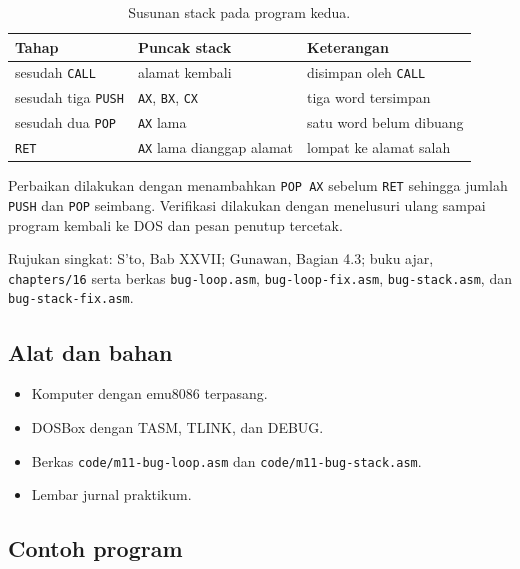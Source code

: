 \begin{table}[H]
    \centering
    \caption{Susunan stack pada program kedua.}
    \label{tab:m11-stack}
    \small
    \begin{tabular}{@{}lll@{}}
        \toprule
        \textbf{Tahap} & \textbf{Puncak stack} & \textbf{Keterangan} \\
        \midrule
        sesudah \texttt{CALL} & alamat kembali &
        disimpan oleh \texttt{CALL} \\
        sesudah tiga \texttt{PUSH} & \texttt{AX}, \texttt{BX},
        \texttt{CX} & tiga word tersimpan \\
        sesudah dua \texttt{POP} & \texttt{AX} lama &
        satu word belum dibuang \\
        \texttt{RET} & \texttt{AX} lama dianggap alamat &
        lompat ke alamat salah \\
        \bottomrule
    \end{tabular}
\end{table}

Perbaikan dilakukan dengan menambahkan \texttt{POP AX} sebelum
\texttt{RET} sehingga jumlah \texttt{PUSH} dan \texttt{POP}
seimbang. Verifikasi dilakukan dengan menelusuri ulang sampai program
kembali ke DOS dan pesan penutup tercetak.

\begin{rujukan}
Rujukan singkat: S'to, Bab XXVII; Gunawan, Bagian 4.3; buku ajar,
\texttt{chapters/16} serta berkas \texttt{bug-loop.asm},
\texttt{bug-loop-fix.asm}, \texttt{bug-stack.asm}, dan
\texttt{bug-stack-fix.asm}.
\end{rujukan}

\subsection{Alat dan bahan}

\begin{itemize}
    \item Komputer dengan emu8086 terpasang.
    \item DOSBox dengan TASM, TLINK, dan DEBUG.
    \item Berkas \texttt{code/m11-bug-loop.asm} dan
          \texttt{code/m11-bug-stack.asm}.
    \item Lembar jurnal praktikum.
\end{itemize}

\subsection{Contoh program}

